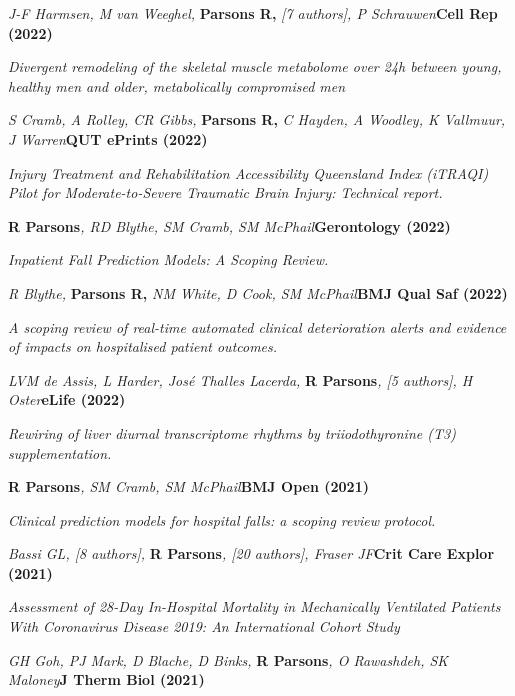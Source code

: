 \item
    \textit{J-F Harmsen, M van Weeghel, }\textbf{Parsons R, }\textit{[7 authors], P Schrauwen}\textbf{\hfill{Cell Rep (2022)}}\par
    \textit{
        Divergent remodeling of the skeletal muscle metabolome over 24h between young, healthy men and older,\newline
        metabolically compromised men
    }
\item
    \textit{S Cramb, A Rolley, CR Gibbs, }\textbf{Parsons R, }\textit{C Hayden, A Woodley, K Vallmuur, J Warren}\textbf{\hfill{QUT ePrints (2022)}}\par
	\textit{
        Injury Treatment and Rehabilitation Accessibility Queensland Index (iTRAQI) Pilot for Moderate-to-Severe \newline
        Traumatic Brain Injury: Technical report.
    }
\item
    \textbf{R Parsons}\textit{, RD Blythe, SM Cramb, SM McPhail}\textbf{\hfill Gerontology (2022)}\par
	\textit{Inpatient Fall Prediction Models: A Scoping Review.}
\item
	\textit{R Blythe, }\textbf{Parsons R, }\textit{NM White, D Cook, SM McPhail}\textbf{\hfill{BMJ Qual Saf (2022)}}\par
	\textit{A scoping review of real-time automated clinical deterioration alerts and evidence of impacts on hospitalised patient outcomes.}
\item
	\textit{LVM de Assis, L Harder, José Thalles Lacerda, }\textbf{R Parsons}\textit{, [5 authors], H Oster}\textbf{\hfill eLife (2022)}\par 
    \textit{Rewiring of liver diurnal transcriptome rhythms by triiodothyronine (T3) supplementation.}
\item
    \textbf{R Parsons}\textit{, SM Cramb, SM McPhail}\textbf{\hfill BMJ Open (2021)}\par 
    \textit{Clinical prediction models for hospital falls: a scoping review protocol.}
\item
    \textit{Bassi GL, [8 authors], }\textbf{R Parsons}\textit{, [20 authors], Fraser JF}\textbf{\hfill Crit Care Explor (2021)}\par 
    \textit{Assessment of 28-Day In-Hospital Mortality in Mechanically Ventilated Patients With Coronavirus Disease 2019: An International Cohort Study}
\item
    \textit{GH Goh, PJ Mark, D Blache, D Binks, }\textbf{R Parsons}\textit{, O Rawashdeh, SK Maloney}\textbf{\hfill J Therm Biol (2021)}\par 
